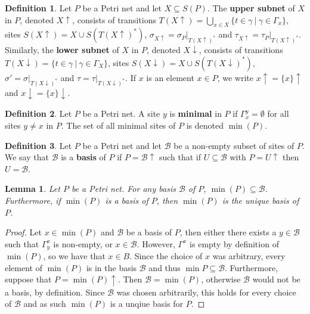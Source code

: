 \documentclass[aps,prd,onecolumn,nofootinbib,letterpaper,preprintnumbers,superscriptaddress,eqsecnum]{revtex4}
\newtheorem{lemma}{Lemma}
\theoremstyle{definition}
\newtheorem{definition}{Definition}
\newcommand{\upset}[1]{#1\!\!\uparrow}
\newcommand{\downset}[1]{#1\!\!\downarrow}
\newcommand{\B}{\mathcal{B}}
\newcommand{\Min}[1]{\min{(#1)}}
\begin{document}
\begin{definition}\label{def:upper-lower-subnet}
    Let $P$ be a Petri net and let $X \subseteq S(P)$.
    The \textbf{upper subnet} of $X$ in $P$, denoted $\upset{X}$, consists of transitions $T(\upset{X}) = \bigcup_{x \in X}\{t \in \gamma ~|~ \gamma \in \Gamma_x\}$, sites $S(\upset{X}) = X \cup S(T(\upset{X})^*)$, $\sigma_{X\uparrow} = \sigma_P|_{T(X\uparrow)^*}$ and $\tau_{X\uparrow} = \tau_P|_{T(X\uparrow)^*}$.
    Similarly, the \textbf{lower subnet} of $X$ in $P$, denoted $\downset{X}$, consists of transitions $T(\downset{X}) = \{t \in \gamma ~|~ \gamma \in \Gamma_X\}$, sites $S(\downset{X}) = X \cup S(T(\downset{X})^*)$, $\sigma' = \sigma|_{T(X\downarrow)^*}$ and $\tau = \tau|_{T(X\downarrow)^*}$.
    If $x$ is an element $x \in P$, we write $\upset{x} = \upset{\{x\}}$ and $\downset{x} = \downset{\{x\}}$.
\end{definition}

\begin{definition}\label{def:minimal}
    Let $P$ be a Petri net. A site $y$ is \textbf{minimal} in $P$ if $\Gamma_x^y = \emptyset$ for all sites $y \ne x$ in $P$.
    The set of all minimal sites of $P$ is denoted $\Min{P}$.
\end{definition}

\begin{definition}\label{def:basis}
    Let $P$ be a Petri net and let $\B$ be a non-empty subset of sites of $P$.
    We say that $\B$ is a \textbf{basis} of $P$ if $P = \upset{\B}$ such that if $U \subseteq \B$ with $P = \upset{U}$ then $U = \B$.
\end{definition}

\begin{lemma}
    Let $P$ be a Petri net. For any basis $\B$ of $P$, $\Min{P} \subseteq \B$.
    Furthermore, if $\Min{P}$ is a basis of $P$, then $\Min{P}$ is the unique basis of $P$.
\end{lemma}
\begin{proof}
    Let $x \in \Min{P}$ and $\B$ be a basis of $P$, then either there exists a $y \in \B$ such that $\Gamma_y^x$ is non-empty, or $x \in \B$.
    However, $\Gamma^x$ is empty by definition of $\Min{P}$, so we have that $x \in B$.
    Since the choice of $x$ was arbitrary, every element of $\Min{P}$ is in the basis $\B$ and thus $\min{P} \subseteq \B$.
    Furthermore, suppose that $P = \upset{\Min{P}}$.
    Then $\B = \Min{P}$, otherwise $\B$ would not be a basis, by definition.
    Since $\B$ was chosen arbitrarily, this holds for every choice of $\B$ and as such $\Min{P}$ is a unqiue basis for $P$.
\end{proof}
\end{document}

